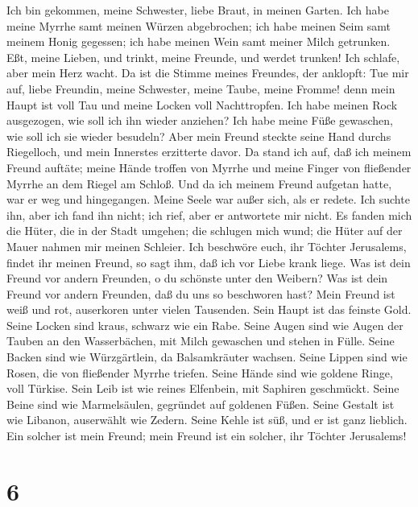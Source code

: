  Ich bin gekommen, meine Schwester, liebe Braut, in meinen
Garten. Ich habe meine Myrrhe samt meinen Würzen abgebrochen; ich habe
meinen Seim samt meinem Honig gegessen; ich habe meinen Wein samt meiner
Milch getrunken. Eßt, meine Lieben, und trinkt, meine Freunde, und
werdet trunken!  Ich schlafe, aber mein Herz wacht. Da ist
die Stimme meines Freundes, der anklopft: Tue mir auf, liebe Freundin,
meine Schwester, meine Taube, meine Fromme! denn mein Haupt ist voll Tau
und meine Locken voll Nachttropfen.  Ich habe meinen Rock
ausgezogen, wie soll ich ihn wieder anziehen? Ich habe meine Füße
gewaschen, wie soll ich sie wieder besudeln?  Aber mein
Freund steckte seine Hand durchs Riegelloch, und mein Innerstes
erzitterte davor.  Da stand ich auf, daß ich meinem Freund
auftäte; meine Hände troffen von Myrrhe und meine Finger von fließender
Myrrhe an dem Riegel am Schloß.  Und da ich meinem Freund
aufgetan hatte, war er weg und hingegangen. Meine Seele war außer sich,
als er redete. Ich suchte ihn, aber ich fand ihn nicht; ich rief, aber
er antwortete mir nicht.  Es fanden mich die Hüter, die in
der Stadt umgehen; die schlugen mich wund; die Hüter auf der Mauer
nahmen mir meinen Schleier.  Ich beschwöre euch, ihr Töchter
Jerusalems, findet ihr meinen Freund, so sagt ihm, daß ich vor Liebe
krank liege.  Was ist dein Freund vor andern Freunden, o du
schönste unter den Weibern? Was ist dein Freund vor andern Freunden, daß
du uns so beschworen hast?  Mein Freund ist weiß und rot,
auserkoren unter vielen Tausenden.  Sein Haupt ist das
feinste Gold. Seine Locken sind kraus, schwarz wie ein Rabe.
 Seine Augen sind wie Augen der Tauben an den Wasserbächen,
mit Milch gewaschen und stehen in Fülle.  Seine Backen sind
wie Würzgärtlein, da Balsamkräuter wachsen. Seine Lippen sind wie Rosen,
die von fließender Myrrhe triefen.  Seine Hände sind wie
goldene Ringe, voll Türkise. Sein Leib ist wie reines Elfenbein, mit
Saphiren geschmückt.  Seine Beine sind wie Marmelsäulen,
gegründet auf goldenen Füßen. Seine Gestalt ist wie Libanon, auserwählt
wie Zedern.  Seine Kehle ist süß, und er ist ganz lieblich.
Ein solcher ist mein Freund; mein Freund ist ein solcher, ihr Töchter
Jerusalems!

\hypertarget{section-5}{%
\section{6}\label{section-5}}

